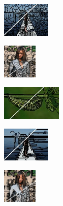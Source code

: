 \begin{figure}
	\begin{subfigure}[b]{0.129\textwidth}
		\includegraphics[height=1.65cm]{pictures/sbd/nc/cropped/nc_0004774_contours}
	\end{subfigure}
	\begin{subfigure}[b]{0.10\textwidth}
		\includegraphics[height=1.65cm]{pictures/fash/nc/cropped/nc_010_contours}
	\end{subfigure}
	\begin{subfigure}[b]{0.02\textwidth}
	\end{subfigure}
	\begin{subfigure}[b]{0.16\textwidth}
		\includegraphics[height=1.65cm]{pictures/bsds500/fh/cropped/fh_35028_contours}
	\end{subfigure}
	\begin{subfigure}[b]{0.129\textwidth}
		\includegraphics[height=1.65cm]{pictures/sbd/fh/cropped/fh_0004774_contours}
	\end{subfigure}
	\begin{subfigure}[b]{0.10\textwidth}
		\includegraphics[height=1.65cm]{pictures/fash/fh/cropped/fh_010_contours}
	\end{subfigure}\\
	\begin{subfigure}[b]{0.02\textwidth}

\end{subfigure}
\end{figure}
